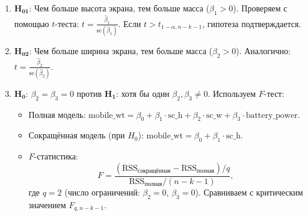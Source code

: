 \documentclass[14pt]{extreport}
\begin{document}
\begin{enumerate}
    \item \(\mathbf{H_{01}}\): Чем больше высота экрана, тем больше масса (\(\beta_1 > 0\)).  
    Проверяем с помощью \(t\)-теста: \(t = \frac{\hat{\beta}_1}{\text{se}(\hat{\beta}_1)}\). Если \(t > t_{1-\alpha, n-k-1}\), гипотеза подтверждается.
    
    \item \(\mathbf{H_{02}}\): Чем больше ширина экрана, тем больше масса (\(\beta_2 > 0\)).  
    Аналогично: \(t = \frac{\hat{\beta}_2}{\text{se}(\hat{\beta}_2)}\).
    
    \item \(\mathbf{H_0}\): \(\beta_2 = \beta_3 = 0\) против \(\mathbf{H_1}\): хотя бы один \(\beta_2, \beta_3 \neq 0\).  
    Используем \(F\)-тест:
    \begin{itemize}
        \item Полная модель: \(\text{mobile\_wt} = \beta_0 + \beta_1 \cdot \text{sc\_h} + \beta_2 \cdot \text{sc\_w} + \beta_3 \cdot \text{battery\_power}\).
        \item Сокращённая модель (при \(H_0\)): \(\text{mobile\_wt} = \beta_0 + \beta_1 \cdot \text{sc\_h}\).
        \item \(F\)-статистика:
        \begin{equation}
        F = \frac{(\text{RSS}_{\text{сокращённая}} - \text{RSS}_{\text{полная}}) / q}{\text{RSS}_{\text{полная}} / (n - k - 1)},
        \end{equation}
        где \(q = 2\) (число ограничений: \(\beta_2 = 0\), \(\beta_3 = 0\)). Сравниваем с критическим значением \(F_{q, n-k-1}\).
    \end{itemize}
\end{enumerate}
\end{document}
